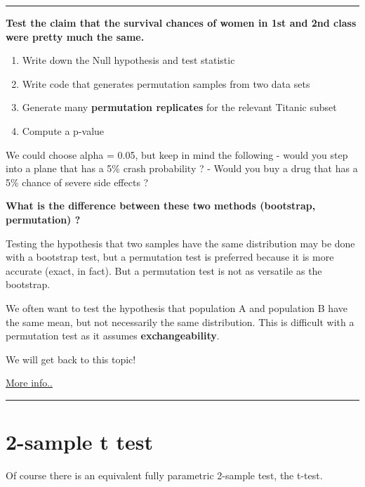 \documentclass[
  letterpaper,
  DIV=11,
  numbers=noendperiod]{scrreprt}
\providecommand{\tightlist}{%
  \setlength{\itemsep}{0pt}\setlength{\parskip}{0pt}}\usepackage{longtable,booktabs,array}
\begin{document}
\begin{center}\rule{0.5\linewidth}{0.5pt}\end{center}

\textbf{Test the claim that the survival chances of women in 1st and 2nd
class were pretty much the same.}

\begin{enumerate}
\def\labelenumi{\arabic{enumi}.}
\tightlist
\item
  Write down the Null hypothesis and test statistic
\item
  Write code that generates permutation samples from two data sets
\item
  Generate many \textbf{permutation replicates} for the relevant Titanic
  subset
\item
  Compute a p-value
\end{enumerate}

We could choose alpha = 0.05, but keep in mind the following - would you
step into a plane that has a 5\% crash probability ? - Would you buy a
drug that has a 5\% chance of severe side effects ?

\textbf{What is the difference between these two methods (bootstrap,
permutation) ?}

Testing the hypothesis that two samples have the same distribution may
be done with a bootstrap test, but a permutation test is preferred
because it is more accurate (exact, in fact). But a permutation test is
not as versatile as the bootstrap.

We often want to test the hypothesis that population A and population B
have the same mean, but not necessarily the same distribution. This is
difficult with a permutation test as it assumes
\textbf{exchangeability}.

We will get back to this topic!

\href{https://ntrs.nasa.gov/archive/nasa/casi.ntrs.nasa.gov/20150001882.pdf}{More
info..}

\begin{center}\rule{0.5\linewidth}{0.5pt}\end{center}

\hypertarget{sample-t-test}{%
\section{2-sample t test}\label{sample-t-test}}

Of course there is an equivalent fully parametric 2-sample test, the
t-test.
\end{document}
